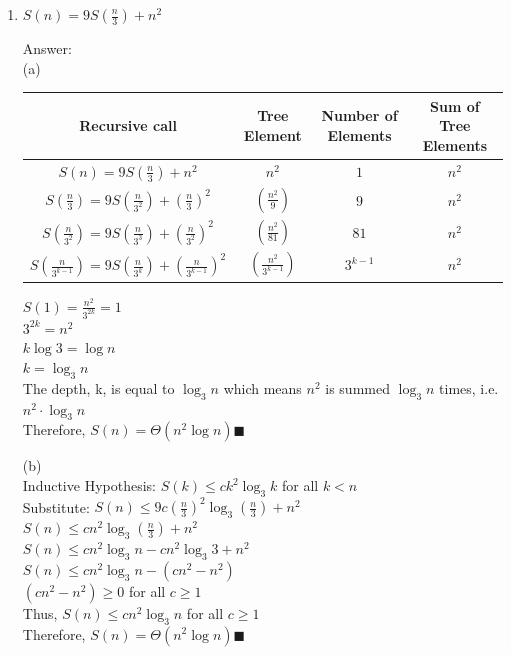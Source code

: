 \documentclass[15pt]{article}
\begin{document}
\begin{enumerate}
{}





\newpage


\item  $S(n) = 9S(\frac{n}{3}) + n^2$     %


{\color{blue} Answer:  \\

(a)   

\begin{table}[h]
    \centering
    \begin{tabular}{|c|c|c|c|}
        \hline
        \textbf{Recursive call} & \textbf{Tree Element} & \textbf{Number of Elements} & \textbf{Sum of Tree Elements} \\
        \hline
        $S(n) = 9S(\frac{n}{3})+n^2$ & $n^2$ & $1$ & $n^2$ \\
        \hline
        $S(\frac{n}{3}) = 9S(\frac{n}{3^2})+(\frac{n}{3})^2$ & $(\frac{n^2}{9})$ & $9$ & $n^2$ \\
        \hline
        $S(\frac{n}{3^2}) = 9S(\frac{n}{3^3})+(\frac{n}{3^2})^2$ & $(\frac{n^2}{81})$ & $81$ & $n^2$ \\
        \hline
        $S(\frac{n}{3^{k-1}}) = 9S(\frac{n}{3^{k}})+(\frac{n}{3^{k-1}})^2$ & $(\frac{n^2}{3^{k-1}})$  & $3^{k-1}$ & $n^2$ \\
        \hline
    \end{tabular}
    \label{tab:sample}
\end{table}

$S(1) = \frac{n^2}{3^{2k}} = 1$\\
$3^{2k} = n^2$\\
$k\log3 = \log n$\\
$k = \log_3n$\\
The depth, k, is equal to $\log_3n$ which means $n^2$ is summed $\log_3n$ times, i.e. $n^2 \cdot \log_3n$\\
Therefore, $S(n) = \Theta(n^2\log n)$$\blacksquare$\\

\vskip 1cm

(b)\\

Inductive Hypothesis: $S(k) \leq ck^2\log_3 k$ for all $k < n$\\
Substitute: $S(n) \leq 9c(\frac{n}{3})^2\log_3(\frac{n}{3}) + n^2$\\
$S(n) \leq cn^2\log_3(\frac{n}{3}) + n^2$\\
$S(n) \leq cn^2\log_3 n - cn^2\log_3 3 + n^2$\\
$S(n) \leq cn^2\log_3 n -(cn^2 -n^2)$\\
$(cn^2 -n^2) \geq 0$ \hspace{2cm} for all $c\geq1$\\
Thus, $S(n) \leq cn^2\log_3 n$ \hspace{2cm} for all $c\geq1$\\
Therefore, $S(n) = \Theta(n^2\log n)$$\blacksquare$\\
}






\end{enumerate} 
\end{document}
